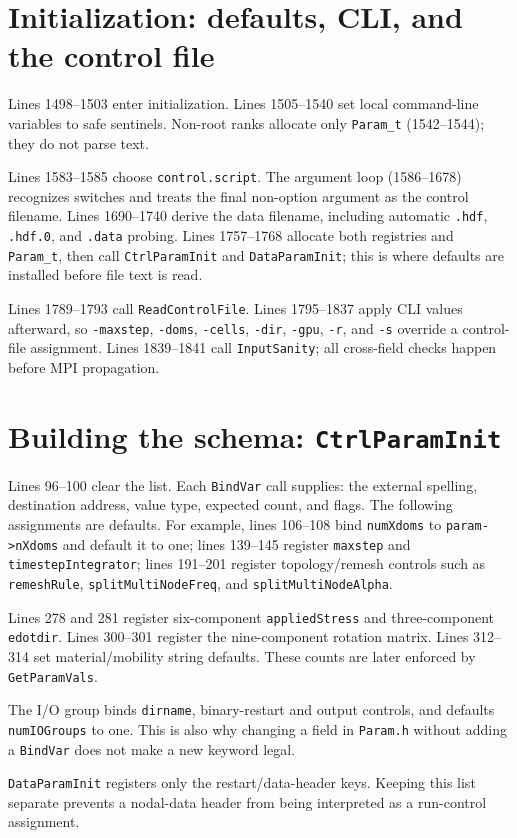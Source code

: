 \documentclass[11pt]{article}
\newcommand{\code}[1]{\texorpdfstring{\nolinkurl{#1}}{#1}}
\begin{document}
\section{Initialization: defaults, CLI, and the control file}

Lines 1498--1503 enter initialization. Lines 1505--1540 set local command-line variables to safe sentinels. Non-root ranks allocate only \code{Param_t} (1542--1544); they do not parse text.

Lines 1583--1585 choose \code{control.script}. The argument loop (1586--1678) recognizes switches and treats the final non-option argument as the control filename. Lines 1690--1740 derive the data filename, including automatic \code{.hdf}, \code{.hdf.0}, and \code{.data} probing. Lines 1757--1768 allocate both registries and \code{Param_t}, then call \code{CtrlParamInit} and \code{DataParamInit}; this is where defaults are installed before file text is read.

Lines 1789--1793 call \code{ReadControlFile}. Lines 1795--1837 apply CLI values afterward, so \code{-maxstep}, \code{-doms}, \code{-cells}, \code{-dir}, \code{-gpu}, \code{-r}, and \code{-s} override a control-file assignment. Lines 1839--1841 call \code{InputSanity}; all cross-field checks happen before MPI propagation.

\section{Building the schema: \code{CtrlParamInit}}

Lines 96--100 clear the list. Each \code{BindVar} call supplies: the external spelling, destination address, value type, expected count, and flags. The following assignments are defaults. For example, lines 106--108 bind \code{numXdoms} to \code{param->nXdoms} and default it to one; lines 139--145 register \code{maxstep} and \code{timestepIntegrator}; lines 191--201 register topology/remesh controls such as \code{remeshRule}, \code{splitMultiNodeFreq}, and \code{splitMultiNodeAlpha}.

Lines 278 and 281 register six-component \code{appliedStress} and three-component \code{edotdir}. Lines 300--301 register the nine-component rotation matrix. Lines 312--314 set material/mobility string defaults. These counts are later enforced by \code{GetParamVals}.

The I/O group binds \code{dirname}, binary-restart and output controls, and defaults \code{numIOGroups} to one. This is also why changing a field in \code{Param.h} without adding a \code{BindVar} does not make a new keyword legal.

\code{DataParamInit} registers only the restart/data-header keys. Keeping this list separate prevents a nodal-data header from being interpreted as a run-control assignment.
\end{document}
